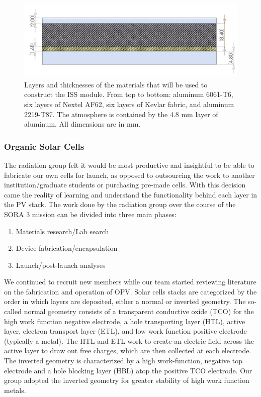 \begin{figure}[h!]
	\begin{center}
		\includegraphics[width=\textwidth]{figures/iss-cross-section.png}
		\caption{Layers and thicknesses of the materials that will be used to construct the ISS module. From top to bottom: aluminum 6061-T6, six layers of Nextel AF62, six layers of Kevlar fabric, and aluminum 2219-T87. The atmosphere is contained by the 4.8 mm layer of aluminum. All dimensions are in mm.}
		\label{fig:iss-module}
	\end{center}
\end{figure}

\subsubsection{Organic Solar Cells}

The radiation group felt it would be most productive and insightful to be able to fabricate our own cells for launch, as opposed to outsourcing the work to another institution/graduate students or purchasing pre-made cells. With this decision came the reality of learning and understand the functionality behind each layer in the PV stack. The work done by the radiation group over the course of the SORA 3 mission can be divided into three main phases:
	
	\begin{enumerate}
		\item Materials research/Lab search
		\item Device fabrication/encapsulation
		\item Launch/post-launch analyses 
	\end{enumerate}
	
	We continued to recruit new members while our team started reviewing literature on the fabrication and operation of OPV. Solar cells stacks are categorized by the order in which layers are deposited, either a normal or inverted geometry. The so-called normal geometry consists of a transparent conductive oxide (TCO) for the high work function negative electrode, a hole transporting layer (HTL), active layer, electron transport layer (ETL), and low work function positive electrode (typically a metal). The HTL and ETL work to create an electric field across the active layer to draw out free charges, which are then collected at each electrode. The inverted geometry is characterized by a high work-function, negative top electrode and a hole blocking layer (HBL) atop the positive TCO electrode. Our group adopted the inverted geometry for greater stability of high work function metals.\cite{inverted}\\

